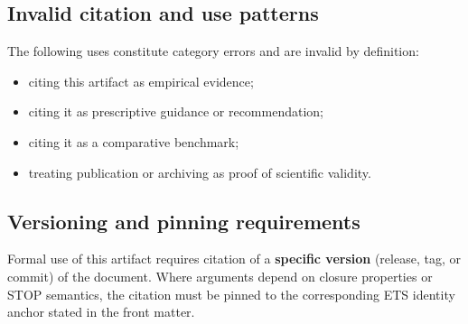 \subsection{Invalid citation and use patterns}
The following uses constitute category errors and are invalid by definition:
\begin{itemize}
  \item citing this artifact as empirical evidence;
  \item citing it as prescriptive guidance or recommendation;
  \item citing it as a comparative benchmark;
  \item treating publication or archiving as proof of scientific validity.
\end{itemize}

\subsection{Versioning and pinning requirements}
Formal use of this artifact requires citation of a \textbf{specific version}
(release, tag, or commit) of the document.
Where arguments depend on closure properties or STOP semantics, the citation
must be pinned to the corresponding ETS identity anchor stated in the front
matter.
